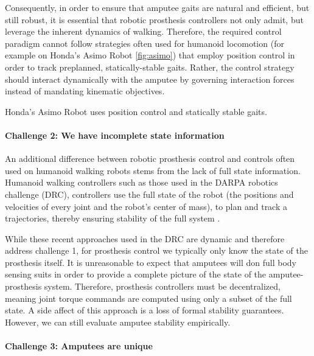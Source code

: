 Consequently, in order to ensure that amputee gaits are natural and efficient,
but still robust, it is essential that robotic prosthesis controllers not only
admit, but leverage the inherent dynamics of walking.  Therefore, the required
control paradigm cannot follow strategies often used for humanoid locomotion
(for example on Honda's Asimo Robot \cref{fig:asimo}) that employ position
control in order to track preplanned, statically-stable gaits. Rather, the
control strategy should interact dynamically with the amputee by governing
interaction forces instead of mandating kinematic objectives.

\begin{marginfigure}
    \centering
    \caption{Honda's Asimo Robot uses position control and statically
    stable gaits.}
    \label{fig:asimo}
\end{marginfigure}

\paragraph{Challenge 2: We have incomplete state information}

An additional difference between robotic prosthesis control and controls often
used on humanoid walking robots stems from the lack of full state information.
Humanoid walking controllers such as those used in the DARPA robotics challenge
(DRC), controllers use the full state of the robot (\ie the positions and
velocities of every joint and the robot's center of mass), to plan and track a
trajectories, thereby ensuring stability of the full system
\citep{feng2015optimization, kuindersma2014efficiently,
englsberger2014trajectory}.

While these recent approaches used in the DRC are dynamic and therefore address
challenge 1, for prosthesis control we typically only know the state of the
prosthesis itself. It is unreasonable to expect that amputees will don full body
sensing suits in order to provide a complete picture of the state of the
amputee-prosthesis system. Therefore, prosthesis controllers must be
decentralized, meaning joint torque commands are computed using only a subset of
the full state. A side affect of this approach is a loss of formal stability
guarantees. However, we can still evaluate amputee stability empirically.

\paragraph{Challenge 3: Amputees are unique}

